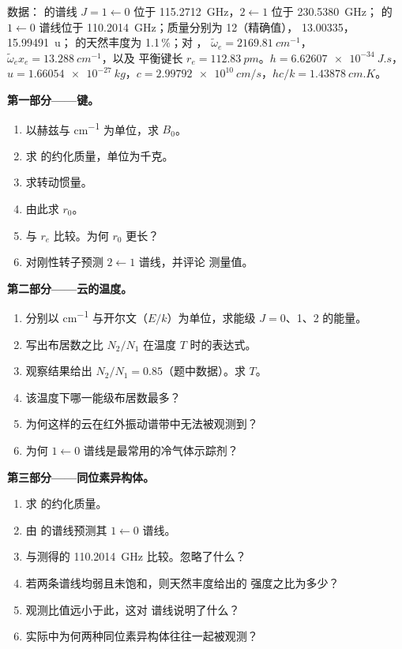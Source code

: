 \begin{problem}
\label{pb:b3:rovibrational-spectroscopy:1}
数据： 的谱线 $J = 1 \leftarrow 0$ 位于 \qty{115.2712}{GHz}，$2
\leftarrow 1$ 位于 \qty{230.5380}{GHz}； 的 $1 \leftarrow 0$ 谱线位于
\qty{110.2014}{GHz}；质量分别为  12（精确值）， 13.00335，
 \qty{15.99491}{u}； 的天然丰度为 1.1\,\%；对 ，
$\tilde\omega_e = \qty{2169.81}{cm^{-1}}$，$\tilde\omega_ex_e = \qty{13.288}{cm^{-1}}$，以及
平衡键长 $r_e = \qty{112.83}{pm}$。$h = \qty{6.62607e-34}{J.s}$，$u =
\qty{1.66054e-27}{kg}$，$c = \qty{2.99792e10}{cm/s}$，$hc/k = \qty{1.43878}{cm.K}$。

\medskip\noindent\textbf{第一部分——键。}
\begin{enumerate}
  \item 以赫兹与 \unit{cm^{-1}} 为单位，求 $B_0$。
  \item 求  的约化质量，单位为千克。
  \item 求转动惯量。
  \item 由此求 $r_0$。
  \item 与 $r_e$ 比较。为何 $r_0$ 更长？
  \item 对刚性转子预测 $2 \leftarrow 1$ 谱线，并评论
        测量值。
\end{enumerate}

\medskip\noindent\textbf{第二部分——云的温度。}
\begin{enumerate}[resume]
  \item 分别以 \unit{cm^{-1}} 与开尔文（$E/k$）为单位，求能级 $J =
        0$、1、2 的能量。
  \item 写出布居数之比 $N_2/N_1$ 在温度 $T$ 时的表达式。
  \item 观察结果给出 $N_2/N_1 = 0.85$（题中数据）。求 $T$。
  \item 该温度下哪一能级布居数最多？
  \item 为何这样的云在红外振动谱带中无法被观测到？
  \item 为何 $1 \leftarrow 0$ 谱线是最常用的冷气体示踪剂？
\end{enumerate}

\medskip\noindent\textbf{第三部分——同位素异构体。}
\begin{enumerate}[resume]
  \item 求  的约化质量。
  \item 由  的谱线预测其 $1 \leftarrow 0$ 谱线。
  \item 与测得的 \qty{110.2014}{GHz} 比较。忽略了什么？
  \item 若两条谱线均弱且未饱和，则天然丰度给出的
        强度之比为多少？
  \item 观测比值远小于此，这对
         谱线说明了什么？
  \item 实际中为何两种同位素异构体往往一起被观测？
\end{enumerate}


\end{problem}
